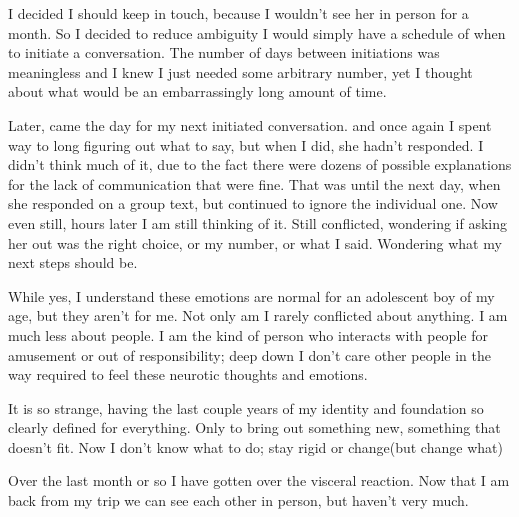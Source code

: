 \par I decided I should keep in touch, because I wouldn't see her in person for a month. So I decided to reduce ambiguity I would simply have a schedule of when to initiate a conversation. The number of days between initiations was meaningless and I knew I just needed some arbitrary number, yet I thought about what would be an embarrassingly long amount of time.
\par Later, came the day for my next initiated conversation. and once again I spent way to long figuring out what to say, but when I did, she hadn't responded. I didn't think much of it, due to the fact there were dozens of possible explanations for the lack of communication that were fine. That was until the next day, when she responded on a group text, but continued to ignore the individual one. Now even still, hours later I am still thinking of it. Still conflicted, wondering if asking her out was the right choice, or my number, or what I said. Wondering what my next steps should be. 
\par While yes, I understand these emotions are normal for an adolescent boy of my age, but they aren't for me. Not only am I rarely conflicted about anything. I am much less about people. I am the kind of person who interacts with people for amusement or out of responsibility; deep down I don't care other people in the way required to feel these neurotic thoughts and emotions.
\par It is so strange, having the last couple years of my identity and foundation so clearly defined for everything. Only to bring out something new, something that doesn't fit. Now I don't know what to do; stay rigid or change(but change what) 
\\
\par Over the last month or so I have gotten over the visceral reaction. Now that I am back from my trip we can see each other in person, but haven't very much. 
